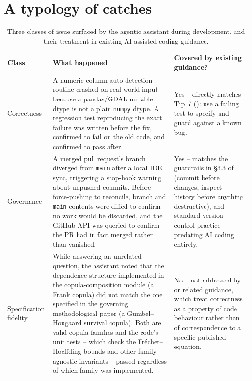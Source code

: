 \documentclass[11pt]{article}
\begin{document}
\section{A typology of catches}
\label{sec:typology}

\begin{table}[t]
\centering
\caption{Three classes of issue surfaced by the agentic assistant during development, and their treatment in existing AI-assisted-coding guidance.}
\label{tab:typology}
\small
\begin{tabular}{@{}p{2.6cm}p{5.6cm}p{5.4cm}@{}}
\toprule
Class & What happened & Covered by existing guidance? \\
\midrule
Correctness &
A numeric-column auto-detection routine crashed on real-world input
because a pandas/GDAL nullable dtype is not a plain \texttt{numpy}
dtype. A regression test reproducing the exact failure was written
before the fix, confirmed to fail on the old code, and confirmed to
pass after. &
Yes -- directly matches Tip~7 (\citeauthor{bridgeford2026}): use a
failing test to specify and guard against a known bug. \\
\addlinespace
Governance &
A merged pull request's branch diverged from \texttt{main} after a
local IDE sync, triggering a stop-hook warning about unpushed commits.
Before force-pushing to reconcile, branch and \texttt{main} contents
were diffed to confirm no work would be discarded, and the GitHub API
was queried to confirm the PR had in fact merged rather than vanished. &
Yes -- matches the guardrails in \S3.3 of \citeauthor{bridgeford2026}
(commit before changes, inspect history before anything destructive),
and standard version-control practice predating AI coding entirely. \\
\addlinespace
Specification fidelity &
While answering an unrelated question, the assistant noted that the
dependence structure implemented in the copula-composition module
(a Frank copula) did not match the one specified in the governing
methodological paper (a Gumbel--Hougaard survival copula). Both are
valid copula families and the code's unit tests -- which check the
Fr\'echet--Hoeffding bounds and other family-agnostic invariants --
passed regardless of which family was implemented. &
No -- not addressed by \citeauthor{bridgeford2026} or related
guidance, which treat correctness as a property of code behaviour
rather than of correspondence to a specific published equation. \\
\bottomrule
\end{tabular}
\end{table}
\end{document}
